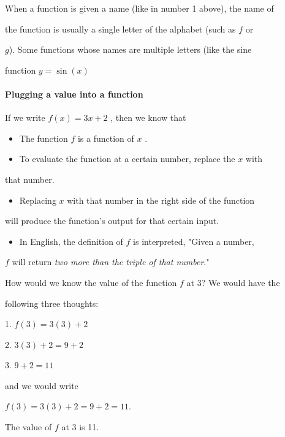 When a function is given a name (like in number 1 above), the name of

the function is usually a single letter of the alphabet (such as $f$ or

$g$). Some functions whose names are multiple letters (like the sine

function $y=\sin(x)$



\paragraph{Plugging a value into a function}



If we write $f(x)=3x+2$ , then we know that



\begin{itemize}
    \item The function $f$ is a function of $x$ .
    \item To evaluate the function at a certain number, replace the $x$ with
\end{itemize}
    that number.

\begin{itemize}
    \item Replacing $x$ with that number in the right side of the function
\end{itemize}
    will produce the function's output for that certain input.

\begin{itemize}
    \item In English, the definition of $f$ is interpreted, "Given a number,
\end{itemize}
    $f$ will return \textit{two more than the triple of that number}."



How would we know the value of the function $f$ at 3? We would have the

following three thoughts:



1.  $f(3)=3(3)+2$

2.  $3(3)+2=9+2$

3.  $9+2=11$



and we would write



$f(3)=3(3)+2=9+2=11$.



The value of $f$ at 3 is 11.



